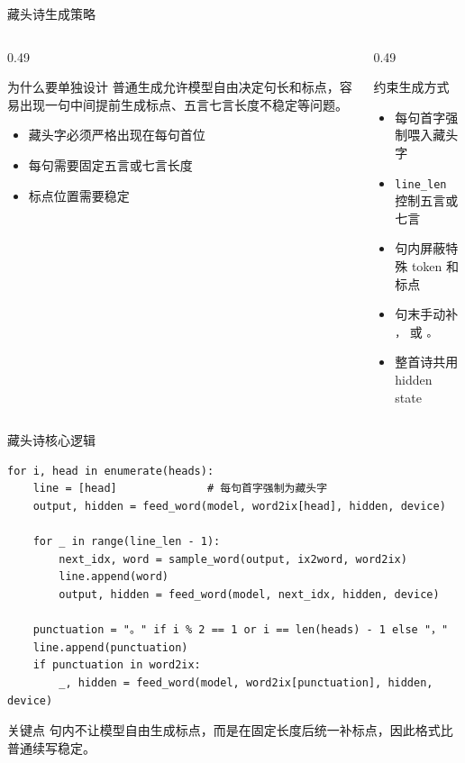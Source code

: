 \documentclass[aspectratio=169,10pt]{ctexbeamer}
\begin{document}
\begin{frame}{藏头诗生成策略}
	\begin{columns}[T,onlytextwidth]
		\begin{column}{0.49\textwidth}
			\begin{block}{为什么要单独设计}
				普通生成允许模型自由决定句长和标点，容易出现一句中间提前生成标点、五言七言长度不稳定等问题。
			\end{block}
			\begin{itemize}
				\item 藏头字必须严格出现在每句首位
				\item 每句需要固定五言或七言长度
				\item 标点位置需要稳定
			\end{itemize}
		\end{column}
		\begin{column}{0.49\textwidth}
			\begin{block}{约束生成方式}
				\begin{itemize}
					\item 每句首字强制喂入藏头字
					\item \texttt{line\_len} 控制五言或七言
					\item 句内屏蔽特殊 token 和标点
					\item 句末手动补 \texttt{，} 或 \texttt{。}
					\item 整首诗共用 hidden state
				\end{itemize}
			\end{block}
		\end{column}
	\end{columns}
\end{frame}

\begin{frame}[fragile]{藏头诗核心逻辑}
\begin{lstlisting}
for i, head in enumerate(heads):
    line = [head]              # 每句首字强制为藏头字
    output, hidden = feed_word(model, word2ix[head], hidden, device)

    for _ in range(line_len - 1):
        next_idx, word = sample_word(output, ix2word, word2ix)
        line.append(word)
        output, hidden = feed_word(model, next_idx, hidden, device)

    punctuation = "。" if i % 2 == 1 or i == len(heads) - 1 else "，"
    line.append(punctuation)
    if punctuation in word2ix:
        _, hidden = feed_word(model, word2ix[punctuation], hidden, device)
\end{lstlisting}

	\vspace{0.25cm}
	\begin{block}{关键点}
		句内不让模型自由生成标点，而是在固定长度后统一补标点，因此格式比普通续写稳定。
	\end{block}
\end{frame}
\end{document}
